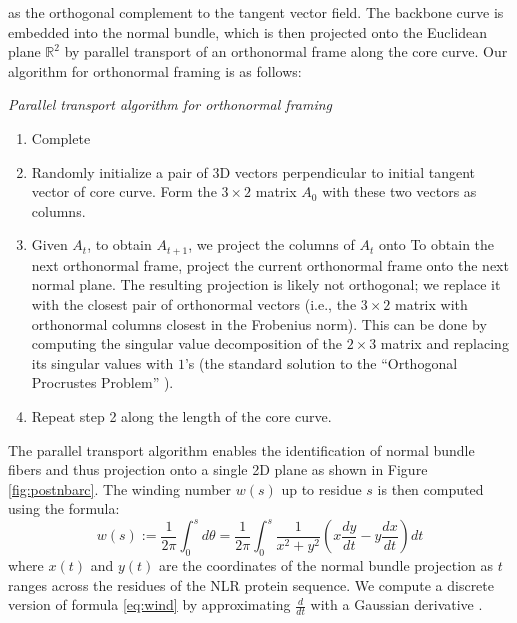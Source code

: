 \documentclass[authoryear]{article}
\begin{document}
  as the orthogonal complement to the tangent vector field. The backbone curve is embedded into the normal bundle, which is then projected onto the Euclidean plane $\mathbb{R}^2$ by parallel transport of an orthonormal frame along the core curve. Our algorithm for orthonormal framing is as follows:\\



\begin{samepage}
\textit{Parallel transport algorithm for orthonormal framing}
\begin{enumerate}
    \item Complete 
    \item Randomly initialize a pair of 3D vectors perpendicular to initial tangent vector of core curve. Form the $3 \times 2$ matrix $A_0$ with these two vectors as columns. 
    \item Given $A_t$, to obtain $A_{t+1}$, we project the columns of $A_t$ onto To obtain the next orthonormal frame, project the current orthonormal frame onto the next normal plane. The resulting projection is likely not orthogonal; we replace it with the closest pair of orthonormal vectors (i.e., the $3 \times 2$ matrix with orthonormal columns closest in the Frobenius norm). This can be done by computing the singular value decomposition of the $2 \times 3$ matrix and replacing its singular values with $1$'s (the standard solution to the ``Orthogonal Procrustes Problem'' \cite{wahba1965least, kabsch1976solution}).
    \item Repeat step 2 along the length of the core curve.    
\end{enumerate}
\end{samepage}

The parallel transport algorithm enables the identification of normal bundle fibers and thus projection onto a single 2D plane as shown in Figure \ref{fig:postnbarc}. The winding number $w(s)$ up to residue $s$ is then computed using the formula:
\begin{equation}\label{eq:wind}
w(s) := \frac{1}{2\pi}\int_{0}^{s} d\theta = \frac{1}{2\pi}\int_{0}^{s}\frac{1}{x^2+y^2}\left(x\frac{dy}{dt}-y\frac{dx}{dt}\right)dt
\end{equation}
where $x(t)$ and $y(t)$ are the coordinates of the normal bundle projection as $t$ ranges across the residues of the NLR protein sequence. We compute a discrete version of formula \ref{eq:wind} by    approximating $\frac{d}{dt}$ with a Gaussian derivative .
\end{document}
